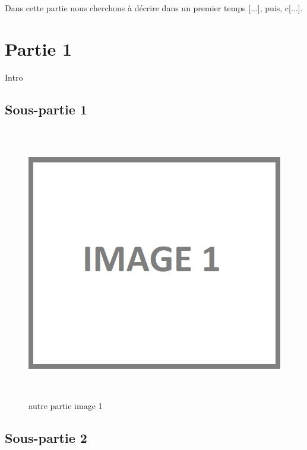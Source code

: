 Dans cette partie nous cherchons à décrire dans un premier temps [...], puis, c[...].

\section{Partie 1}

Intro

\subsection{Sous-partie 1}

\begin{figure}[!ht]
\begin{center}
\includegraphics[height=12cm]{autre_partie/image1}
\end{center}
\caption[autre partie générale]{autre partie image 1\protect\footnotemark}
\end{figure}


\newpage{}

\subsection{Sous-partie 2}

